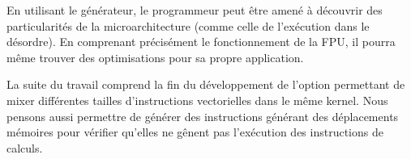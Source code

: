     En utilisant le générateur, le programmeur peut être amené à découvrir des particularités de la microarchitecture (comme celle de l'exécution dans le désordre). En comprenant précisément le fonctionnement de la FPU, il pourra même trouver des optimisations pour sa propre application.
    
    La suite du travail comprend la fin du développement de l'option permettant de mixer différentes tailles d'instructions vectorielles dans le même kernel. Nous pensons aussi permettre de générer des instructions générant des déplacements mémoires pour vérifier qu'elles ne gênent pas l'exécution des instructions de calculs.
    

\newpage